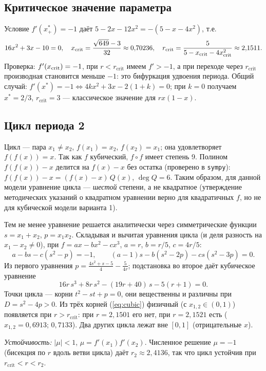 \documentclass[12pt,a4paper]{article}
\newcommand{\rc}{r_{\mathrm{crit}}}
\begin{document}
\subsection{Критическое значение параметра}
Условие $f'(x^*_+)=-1$ даёт $5-2x-12x^2=-(5-x-4x^2)$, т.е.
\begin{equation}16x^2+3x-10=0,\quad x_{\rm crit}=\frac{\sqrt{649}-3}{32}\approx0{,}70236,\quad \rc=\frac5{5-x_{\rm crit}-4x_{\rm crit}^2}\approx2{,}1511.\label{eq:rc}\end{equation}
Проверка: $f'(x_{\rm crit})=-1$, при $r<\rc$ имеем $f'>-1$, а при переходе через $\rc$ производная становится меньше $-1$: это бифуркация удвоения периода. Общий случай: $f'(x^*)=-1\iff4kx^2+3x-2(1+k)=0$; при $k=0$ получаем $x^*=2/3$, $\rc=3$ --- классическое значение для $rx(1-x)$.

\subsection{Цикл периода 2}
Цикл --- пара $x_1\ne x_2$, $f(x_1)=x_2$, $f(x_2)=x_1$; она удовлетворяет $f(f(x))=x$. Так как $f$ кубический, $f\circ f$ имеет степень 9. Полином $f(f(x))-x$ делится на $f(x)-x$ без остатка (проверено в \texttt{sympy}): $f(f(x))-x=(f(x)-x)\,Q(x)$, $\deg Q=6$. Таким образом, для данной модели уравнение цикла --- \emph{шестой} степени, а не квадратное (утверждение методических указаний о квадратном уравнении верно для квадратичных $f$, но не для кубической модели варианта 1).

Тем не менее уравнение решается аналитически через симметрические функции $s=x_1+x_2$, $p=x_1x_2$. Складывая и вычитая уравнения цикла (и деля разность на $x_1-x_2\ne0$), при $f=ax-bx^2-cx^3$, $a=r$, $b=r/5$, $c=4r/5$:
\begin{equation}a-bs-c(s^2-p)=-1,\qquad (a-1)s-b(s^2-2p)-cs(s^2-3p)=0.\end{equation}
Из первого уравнения $p=\frac{4s^2+s-5}4-\frac5{4r}$; подстановка во второе даёт кубическое уравнение
\begin{equation}16r\,s^3+8r\,s^2-(19r+40)\,s-5(r+1)=0.\label{eq:cubic}\end{equation}
Точки цикла --- корни $t^2-st+p=0$, они вещественны и различны при $D=s^2-4p>0$. Из трёх корней (\ref{eq:cubic}) физичный (с $x_{1,2}\in(0,1)$) появляется при $r>\rc$: при $r=2{,}1501$ его нет, при $r=2{,}1521$ есть ($x_{1,2}=0{,}6913;\,0{,}7133$). Два других цикла лежат вне $[0,1]$ (отрицательные $x$).

\emph{Устойчивость:} $|\mu|<1$, $\mu=f'(x_1)f'(x_2)$. Численное решение $\mu=-1$ (бисекция по $r$ вдоль ветви цикла) даёт $r_2\approx2{,}4136$, так что цикл устойчив при $\rc<r<r_2$.
\end{document}
